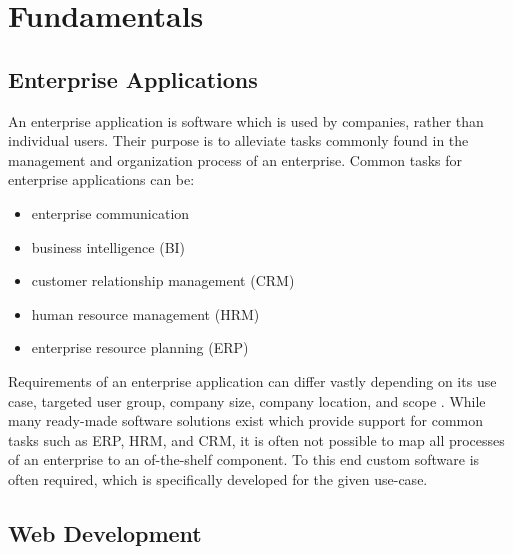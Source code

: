 \chapter{Fundamentals}
\label{ch:fundamentals}



\section{Enterprise Applications}
\label{sec:enterprise-applications}



An enterprise application is software which is used by companies, rather than individual users. Their purpose is to alleviate tasks commonly found in the management and organization process of an enterprise. Common tasks for enterprise applications can be:
\begin{itemize}
    \item enterprise communication
    \item business intelligence (BI)
    \item customer relationship management (CRM)
    \item human resource management (HRM)
    \item enterprise resource planning (ERP)
\end{itemize}

Requirements of an enterprise application can differ vastly depending on its use case, targeted user group, company size, company location, and scope \cite{noauthor_what_nodate,beal_what_2010}. While many ready-made software solutions exist which provide support for common tasks such as ERP, HRM, and CRM, it is often not possible to map all processes of an enterprise to an of-the-shelf component. To this end custom software is often required, which is specifically developed for the given use-case.

\section{Web Development}
\label{sec:web-development}

